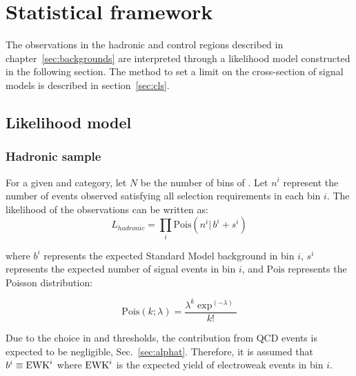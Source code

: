 \clearpage
\section{Statistical framework}
\label{sec:statistics}
The observations in the hadronic and control regions described in 
chapter~\ref{sec:backgrounds} are interpreted through a likelihood model 
constructed in the following section. The method to set a limit on the 
cross-section of signal models is described in section~\ref{sec:cls}. 

\subsection{Likelihood model\label{sec:likelihood}}

\subsubsection{Hadronic sample}
\label{sec:hadronicLikelihood}

For a given \njet and \nb category, 
let $N$ be the number of bins of \HT. Let $n^i$ represent 
the number of events observed satisfying all selection requirements 
in each \HT bin $i$.  The likelihood of the observations can be written
as:
\begin{equation}
L_{hadronic}=\prod_i \mathrm{Pois}(n^i |\, b^i + s^i)
\label{eq:hadronicLikelihood}
\end{equation}

where $b^i$ represents the expected Standard Model background in bin
$i$, $s^i$ represents the expected number of signal events in bin $i$,
and $\mathrm{Pois}$ represents the Poisson distribution:

\begin{equation}
\mathrm{Pois}\left(k;\lambda\right)= \frac{\lambda^k \exp^{\left(-\lambda\right)}}{k!}
\label{eq:poisson}
\end{equation}

Due to the choice in \alphat and \scalht thresholds, the contribution 
from QCD events is expected to be negligible, Sec.~\ref{sec:alphat}. Therefore,
it is assumed that $b^i\equiv \mathrm{EWK}^i$ where $\mathrm{EWK}^i$ is the expected 
yield of electroweak events in bin $i$.


